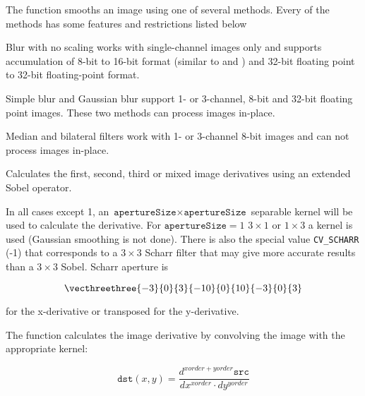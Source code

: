 The function smooths an image using one of several methods. Every of the methods has some features and restrictions listed below

Blur with no scaling works with single-channel images only and supports accumulation of 8-bit to 16-bit format (similar to  and ) and 32-bit floating point to 32-bit floating-point format.

Simple blur and Gaussian blur support 1- or 3-channel, 8-bit and 32-bit floating point images. These two methods can process images in-place.

Median and bilateral filters work with 1- or 3-channel 8-bit images and can not process images in-place.

Calculates the first, second, third or mixed image derivatives using an extended Sobel operator.


\begin{description}
\end{description}

In all cases except 1, an $\texttt{apertureSize} \times
\texttt{apertureSize}$ separable kernel will be used to calculate the
derivative. For $\texttt{apertureSize} = 1$ $ 3 \times 1$ or $ 1 \times 3$
a kernel is used (Gaussian smoothing is not done). There is also the special
value \texttt{CV\_SCHARR} (-1) that corresponds to a $3\times3$ Scharr
filter that may give more accurate results than a $3\times3$ Sobel. Scharr
aperture is

\[ \vecthreethree
{-3}{0}{3}
{-10}{0}{10}
{-3}{0}{3}
\]

for the x-derivative or transposed for the y-derivative.

The function calculates the image derivative by convolving the image with the appropriate kernel:

\[
\texttt{dst}(x,y) = \frac{d^{xorder+yorder} \texttt{src}}{dx^{xorder} \cdot dy^{yorder}}
\]

